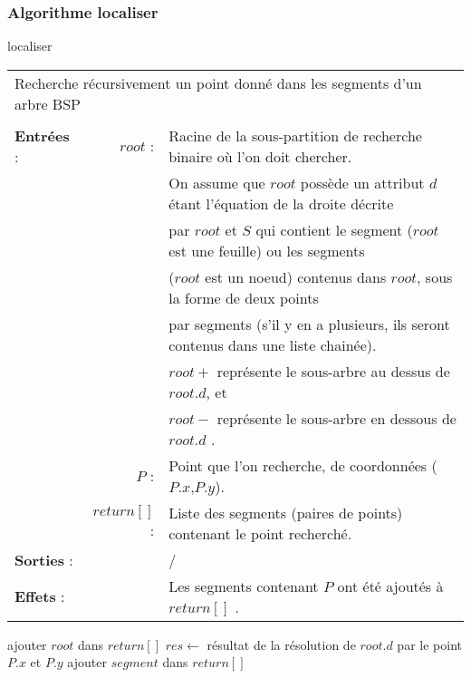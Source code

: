 \documentclass[10pt]{article}
\begin{document}
\subsubsection{Algorithme localiser}
\begin{algorithm}[H]
\caption{localiser}
\begin{tabular}{lrl}
\multicolumn{3}{l}{Recherche récursivement un point donné dans les segments d'un arbre BSP}\\
&&\\
\textbf{Entrées} : &$root$ : &Racine de la sous-partition de recherche binaire où l'on doit chercher.\\
&&On assume que $root$ possède un attribut $d$ étant l'équation de la droite décrite\\
&&par $root$ et $S$ qui contient le segment ($root$ est une feuille) ou les segments\\
&&($root$ est un noeud) contenus dans $root$, sous la forme de deux points\\
&& par segments (s'il y en a plusieurs, ils seront contenus dans une liste chainée).\\
&&$root+$ représente le sous-arbre au dessus de $root.d$, et\\
&&$root-$ représente le sous-arbre en dessous de $root.d$ .\\
&$P$ :&Point que l'on recherche, de coordonnées ($P.x$,$P.y$).\\
&$return[]$ :&Liste des segments (paires de points) contenant le point recherché.\\
\textbf{Sorties} :& &/\\
\textbf{Effets} :& &Les segments contenant $P$ ont été ajoutés à $return[]$ .
\end{tabular}
\begin{algorithmic}[1]
\State ajouter $root$ dans $return[]$
\EndIf
\Else
\State $res\gets$ résultat de la résolution de $root.d$ par le point $P.x$ et $P.y$
\State {}
\State {}
\Else
{}
\State ajouter $segment$ dans $return[]$
\EndIf
\EndFor
\State{}
\State{}
\EndIf
\EndIf
\EndProcedure
\end{algorithmic}
\end{algorithm}
\end{document}
